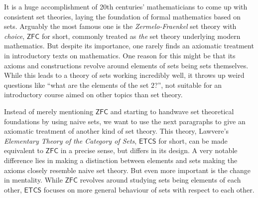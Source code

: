 	It is a huge accomplishment of 20th centuries' mathematicians to come up with consistent set theories, laying the foundation of formal mathematics based on sets. Arguably the most famous one is the \textit{Zermelo-Fraenkel} set theory with \textit{choice}, $\mathsf{ZFC}$ for short, commonly treated as \textit{the} set theory underlying modern mathematics. But despite its importance, one rarely finds an axiomatic treatment in introductory texts on mathematics. One reason for this might be that its axioms and constructions revolve around elements of sets being sets themselves. While this leads to a theory of sets working incredibly well, it throws up weird questions like \enquote{what are the elements of the set $2$?}, not suitable for an introductory course aimed on other topics than set theory. %

	Instead of merely mentioning $\mathsf{ZFC}$ and starting to handwave set theoretical foundations by using naive sets, we want to use the next paragraphs to give an axiomatic treatment of another kind of set theory. This theory, Lawvere's \textit{Elementary Theory of the Category of Sets}, $\mathsf{ETCS}$ for short, can be made equivalent to $\mathsf{ZFC}$ in a precise sense, but differs in its design. A very notable difference lies in making a distinction between elements and sets making the axioms closely resemble naive set theory. But even more important is the change in mentality. While $\mathsf{ZFC}$ revolves around studying sets being elements of each other, $\mathsf{ETCS}$ focuses on more general behaviour of sets with respect to each other. %


